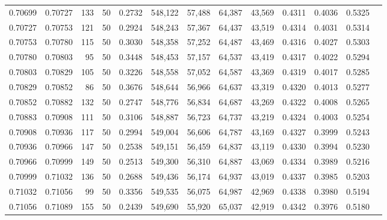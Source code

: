 \begin{tabular}{rrrrrrrrrrrrr}
0.70699 & 0.70727 &   133 &  50 &                                     0.2732 & 548,122 &  57,488 &  64,387 &  43,569 & 0.4311 & 0.4036 & 0.5325 \\
0.70727 & 0.70753 &   121 &  50 &                                     0.2924 & 548,243 &  57,367 &  64,437 &  43,519 & 0.4314 & 0.4031 & 0.5314 \\
0.70753 & 0.70780 &   115 &  50 &                                     0.3030 & 548,358 &  57,252 &  64,487 &  43,469 & 0.4316 & 0.4027 & 0.5303 \\
0.70780 & 0.70803 &    95 &  50 &                                     0.3448 & 548,453 &  57,157 &  64,537 &  43,419 & 0.4317 & 0.4022 & 0.5294 \\
0.70803 & 0.70829 &   105 &  50 &                                     0.3226 & 548,558 &  57,052 &  64,587 &  43,369 & 0.4319 & 0.4017 & 0.5285 \\
0.70829 & 0.70852 &    86 &  50 &                                     0.3676 & 548,644 &  56,966 &  64,637 &  43,319 & 0.4320 & 0.4013 & 0.5277 \\
0.70852 & 0.70882 &   132 &  50 &                                     0.2747 & 548,776 &  56,834 &  64,687 &  43,269 & 0.4322 & 0.4008 & 0.5265 \\
0.70883 & 0.70908 &   111 &  50 &                                     0.3106 & 548,887 &  56,723 &  64,737 &  43,219 & 0.4324 & 0.4003 & 0.5254 \\
0.70908 & 0.70936 &   117 &  50 &                                     0.2994 & 549,004 &  56,606 &  64,787 &  43,169 & 0.4327 & 0.3999 & 0.5243 \\
0.70936 & 0.70966 &   147 &  50 &                                     0.2538 & 549,151 &  56,459 &  64,837 &  43,119 & 0.4330 & 0.3994 & 0.5230 \\
0.70966 & 0.70999 &   149 &  50 &                                     0.2513 & 549,300 &  56,310 &  64,887 &  43,069 & 0.4334 & 0.3989 & 0.5216 \\
0.70999 & 0.71032 &   136 &  50 &                                     0.2688 & 549,436 &  56,174 &  64,937 &  43,019 & 0.4337 & 0.3985 & 0.5203 \\
0.71032 & 0.71056 &    99 &  50 &                                     0.3356 & 549,535 &  56,075 &  64,987 &  42,969 & 0.4338 & 0.3980 & 0.5194 \\
0.71056 & 0.71089 &   155 &  50 &                                     0.2439 & 549,690 &  55,920 &  65,037 &  42,919 & 0.4342 & 0.3976 & 0.5180 \\

\end{tabular}
